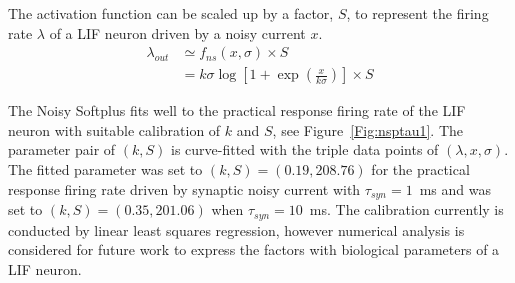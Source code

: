	The activation function can be scaled up by a factor, $S$, to represent the firing rate $\lambda$ of a LIF neuron driven by a noisy current $x$.
	\begin{equation}
	\begin{aligned}
	\lambda_{out} &\simeq f_{ns}(x, \sigma) \times S\\
	&=k \sigma \log [1 + \exp(\frac{x}{k \sigma})] \times S
	\end{aligned}
	\label{equ:fit}
	\end{equation}	
	
	The Noisy Softplus fits well to the practical response firing rate of the LIF neuron with suitable calibration of $k$ and $S$, see Figure~\ref{Fig:nsptau1}.
	The parameter pair of $(k, S)$ is curve-fitted with the triple data points of $(\lambda, x, \sigma)$.
	The fitted parameter was set to $(k, S)=(0.19,208.76)$ for the practical response firing rate driven by synaptic noisy current with $\tau_{syn}=1$~ms and was set to $(k, S)=(0.35,201.06)$ when $\tau_{syn}=10$~ms.
	The calibration currently is conducted by linear least squares regression, however numerical analysis is considered for future work to express the factors with biological parameters of a LIF neuron.
	
